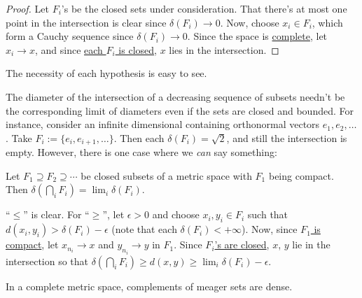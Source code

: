 	\begin{proof}
		Let $F_i$'s be the closed sets under consideration. That there's at most one point in the intersection is clear since \ul{$\delta(F_i)\to 0$}. Now, choose
		$x_i\in F_i$, which form a Cauchy sequence since \ul{$\delta(F_i)\to 0$}. Since the space is \ul{complete}, let $x_i\to x$, and since \ul{each $F_i$ is closed}, $x$ lies in the intersection.
	\end{proof}
	
	\begin{rmk}
		The necessity of each hypothesis is easy to see.
	\end{rmk}
	
	\begin{dgrs}
		The diameter of the intersection of a decreasing sequence of subsets needn't be the corresponding limit of diameters even if the sets are closed and bounded. For instance, consider an infinite dimensional \NLS containing orthonormal vectors $e_1, e_2, \ldots$. Take $F_i := \{e_i, e_{i + 1}, \ldots\}$. Then each $\delta(F_i) = \sqrt 2$, and still the intersection is empty. However, there is one case where we \emph{can} say something:
		
		\begin{prp}
			Let $F_1\supseteq F_2\supseteq\cdots$ be closed subsets of a metric space with $F_1$ being compact. Then $\delta(\bigcap_i F_i) = \lim_i\delta(F_i)$.
		\end{prp}
		
		\begin{dgrsProof}
			``$\le$'' is clear. For ``$\ge$'', let $\epsilon> 0$ and choose $x_i, y_i\in F_i$ such that $d(x_i, y_i) > \delta(F_i) - \epsilon$ (note that each $\delta(F_i) < +\infty$). Now, since \ul{$F_1$ is compact}, let $x_{n_i}\to x$ and $y_{n_i}\to y$ in $F_1$. Since \ul{$F_i$'s are closed}, $x$, $y$ lie in the intersection so that $\delta(\bigcap_i F_i)\ge d(x, y)\ge \lim_i\delta(F_i) - \epsilon$.
		\end{dgrsProof}
	\end{dgrs}
	
	\begin{thm}\label{THM: BCT}
		In a complete metric space, complements of meager sets are dense.
	\end{thm}
	

